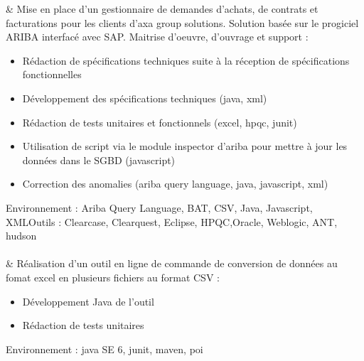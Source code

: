 
& Mise en place d'un gestionnaire de demandes d'achats, de contrats et facturations pour les clients d'axa group solutions. Solution basée sur le progiciel ARIBA interfacé avec SAP. Maitrise d'oeuvre, d'ouvrage et support :%
\begin{itemize}%
\item Rédaction de spécifications techniques suite à la réception de spécifications fonctionnelles
\item Développement des spécifications techniques (java, xml)
\item Rédaction de tests unitaires et fonctionnels (excel, hpqc, junit)
\item Utilisation de script via le module inspector d'ariba pour mettre à jour les données dans le SGBD (javascript)
\item Correction des anomalies (ariba query language, java, javascript, xml)
\end{itemize}%
Environnement : Ariba Query Language, BAT, CSV, Java, Javascript, XMLOutils : Clearcase, Clearquest, Eclipse, HPQC,Oracle, Weblogic, ANT, hudson\\\\
& Réalisation d'un outil en ligne de commande de conversion de données au fomat excel en plusieurs fichiers au format CSV : %
\begin{itemize}%
\item Développement Java de l'outil
\item Rédaction de tests unitaires
\end{itemize}%
Environnement : java SE 6, junit, maven, poi\\\\
